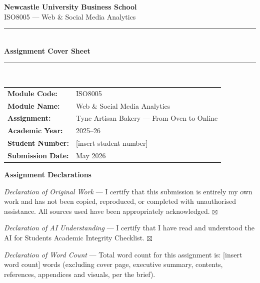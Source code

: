\documentclass[
  11pt,
]{article}
\author{}
\date{\vspace{-2.5em}}
\begin{document}
\thispagestyle{empty}
\begin{center}
\vspace*{0.5cm}
{\Large \textbf{Newcastle University Business School}}\\[6pt]
{\large ISO8005 — Web \& Social Media Analytics}\\[18pt]

\rule{\linewidth}{0.4pt}\\[6pt]
{\LARGE \textbf{Assignment Cover Sheet}}\\[6pt]
\rule{\linewidth}{0.4pt}\\[18pt]
\end{center}

\begin{tabular}{p{4.5cm} p{10cm}}
\textbf{Module Code:}     & ISO8005 \\
\textbf{Module Name:}     & Web \& Social Media Analytics \\
\textbf{Assignment:}      & Tyne Artisan Bakery — From Oven to Online \\
\textbf{Academic Year:}   & 2025–26 \\
\textbf{Student Number:}  & [insert student number] \\
\textbf{Submission Date:} & May 2026 \\
\end{tabular}

\vspace{0.8cm}

\textbf{Assignment Declarations} \vspace{0.2cm}

\textit{Declaration of Original Work} --- I certify that this submission
is entirely my own work and has not been copied, reproduced, or
completed with unauthorised assistance. All sources used have been
appropriately acknowledged. \hfill \(\boxtimes\)

\vspace{0.4cm}

\textit{Declaration of AI Understanding} --- I certify that I have read
and understood the AI for Students Academic Integrity Checklist.
\hfill \(\boxtimes\)

\vspace{0.4cm}

\textit{Declaration of Word Count} --- Total word count for this
assignment is: {[}insert word count{]} words (excluding cover page,
executive summary, contents, references, appendices and visuals, per the
brief).

\vspace{0.4cm}
\end{document}
